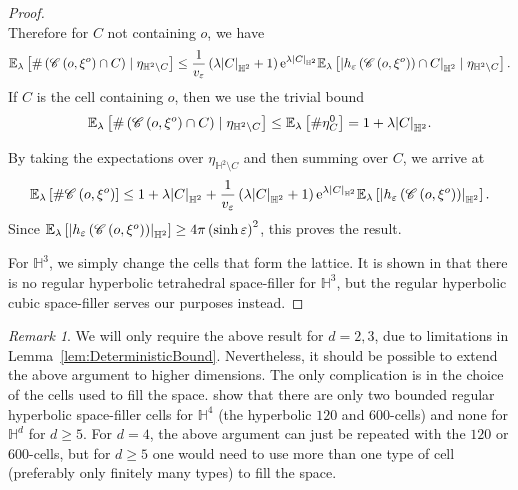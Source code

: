 \documentclass[10pt,a4paper,dvipsnames]{article}
\theoremstyle{definition}
\theoremstyle{remark}
\newtheorem{remark}[theorem]{Remark}
\newcommand{\ela}{\mathbb E_{\lambda}}
\newcommand{\HypTwo}{{\mathbb{H}^2}}
\newcommand{\HypThree}{{\mathbb{H}^3}}
\newcommand{\HypDim}{{\mathbb{H}^d}}
\newcommand{\C}{\mathscr {C}}
\DeclarePairedDelimiter\abs{\lvert}{\rvert}
\newcommand{\habs}[1]{\abs*{#1}_\HypTwo}
\newcommand{\orig}{o}
\newcommand{\e}{\mathrm{e}}
\numberwithin{equation}{section}
\begin{document}
\begin{proof}
\begin{equation}
    \end{equation}
    Therefore for $C$ not containing $\orig$, we have
    \begin{equation}
        \ela\left[\#\left(\C\left(\orig,\xi^\orig\right)\cap C\right) \mid\eta_{\HypTwo\setminus C}\right] \leq \frac{1}{v_\varepsilon}\left(\lambda\habs{C}+1\right)\e^{\lambda\habs{C}}\ela\left[\habs{h_\varepsilon\left(\C\left(\orig,\xi^\orig\right)\right)\cap C} \mid\eta_{\HypTwo\setminus C}\right].
    \end{equation}
    If $C$ is the cell containing $\orig$, then we use the trivial bound
    \begin{equation}
        \ela\left[\#\left(\C\left(\orig,\xi^\orig\right)\cap C\right) \mid\eta_{\HypTwo\setminus C}\right] \leq \ela\left[\#\eta^0_C\right] = 1+\lambda\habs{C}.
    \end{equation}

    By taking the expectations over $\eta_{\HypTwo\setminus C}$ and then summing over $C$, we arrive at
    \begin{equation}
        \ela\left[\#\C\left(\orig,\xi^\orig\right)\right] \leq  1+\lambda\habs{C} + \frac{1}{v_\varepsilon}\left(\lambda\habs{C}+1\right)\e^{\lambda\habs{C}}\ela\left[\habs{h_\varepsilon\left(\C\left(\orig,\xi^\orig\right)\right)}\right].
    \end{equation}
    Since $\ela\left[\habs{h_\varepsilon\left(\C\left(\orig,\xi^\orig\right)\right)}\right] \geq 4\pi\left(\sinh\varepsilon\right)^2$, this proves the result.

    For $\HypThree$, we simply change the cells that form the lattice. It is shown in \cite{brandts2024regular} that there is no regular hyperbolic tetrahedral space-filler for $\HypThree$, but the regular hyperbolic cubic space-filler serves our purposes instead.
\end{proof}

\begin{remark}
    We will only require the above result for $d=2,3$, due to limitations in Lemma~\ref{lem:DeterministicBound}. Nevertheless, it should be possible to extend the above argument to higher dimensions. The only complication is in the choice of the cells used to fill the space. \cite{brandts2024regular} show that there are only two bounded regular hyperbolic space-filler cells for $\mathbb{H}^4$ (the hyperbolic $120$ and $600$-cells) and none for $\HypDim$ for $d\geq 5$. For $d=4$, the above argument can just be repeated with the $120$ or $600$-cells, but for $d\geq 5$ one would need to use more than one type of cell (preferably only finitely many types) to fill the space.
\end{remark}
\end{document}
